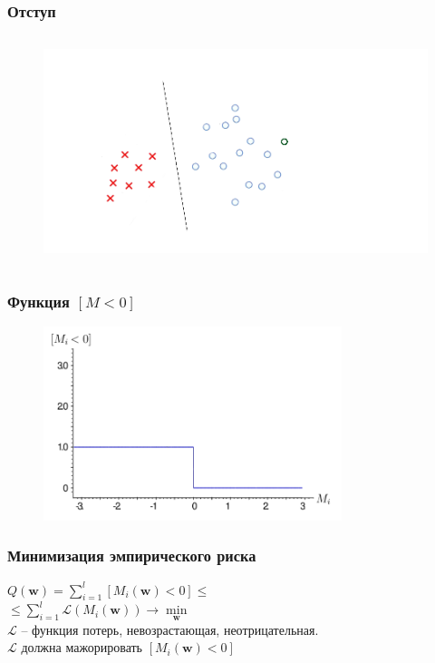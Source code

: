 \documentclass[10pt]{beamer}
\begin{document}
\begin{frame}\frametitle{Отступ}
	\begin{figure}[htbp]
	  \includegraphics[height=190pt, keepaspectratio = true]{images/margin2}
	\end{figure}
\end{frame}

\begin{frame}\frametitle{Функция $[M<0]$}
	\begin{figure}[htbp]
	  \includegraphics[height=160pt, keepaspectratio = true]{images/l1}
	\end{figure}
\end{frame}

\begin{frame}\frametitle{Минимизация эмпирического риска}
	${Q(\mathbf{w}) = \sum\limits_{i=1}^l \left[ M_i(\mathbf{w}) < 0 \right] \leq}$\\ \vspace{3mm}
	\hspace{10mm} ${\leq \sum\limits_{i=1}^l \mathcal{L}(M_i(\mathbf{w})) \rightarrow \min\limits_{\mathbf{w}} }$\\\vspace{3mm}
	$\mathcal{L}$ -- функция потерь, невозрастающая, неотрицательная.\\
	$\mathcal{L}$ должна мажорировать $\left[M_i(\mathbf{w}) < 0 \right]$
\end{frame}
\end{document}
